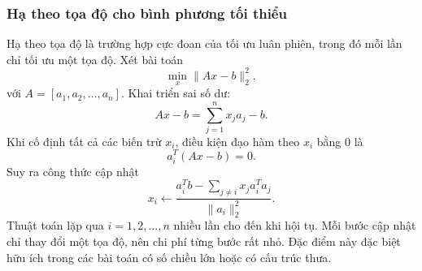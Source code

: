 \subsubsection*{Hạ theo tọa độ cho bình phương tối thiểu}
Hạ theo tọa độ là trường hợp cực đoan của tối ưu luân phiên, trong đó mỗi lần chỉ tối ưu một tọa độ. Xét bài toán
\begin{equation}
    \min_x \|Ax-b\|_2^2,
    \label{eq_cd_ls}
\end{equation}
với $A=[a_1,a_2,\dots,a_n]$. Khai triển sai số dư:
\begin{equation}
    Ax-b=\sum_{j=1}^{n}x_ja_j-b.
    \label{eq_cd_expansion}
\end{equation}
Khi cố định tất cả các biến trừ $x_i$, điều kiện đạo hàm theo $x_i$ bằng $0$ là
\begin{equation}
    a_i^{T}(Ax-b)=0.
    \label{eq_cd_derivative}
\end{equation}
Suy ra công thức cập nhật
\begin{equation}
    x_i
    \leftarrow
    \frac{a_i^{T}b-\sum_{j\neq i}x_j a_i^{T}a_j}
         {\|a_i\|_2^2}.
    \label{eq_cd_update_ls}
\end{equation}
Thuật toán lặp qua $i=1,2,\dots,n$ nhiều lần cho đến khi hội tụ. Mỗi bước cập nhật chỉ thay đổi một tọa độ, nên chi phí từng bước rất nhỏ. Đặc điểm này đặc biệt hữu ích trong các bài toán có số chiều lớn hoặc có cấu trúc thưa.

